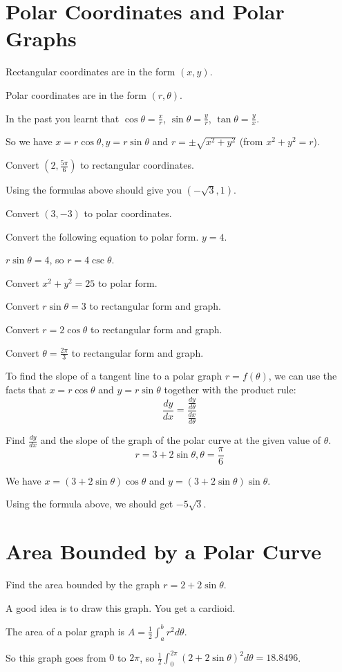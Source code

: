 \documentclass[../bccalc.tex]{subfiles}
\begin{document}
\section{Polar Coordinates and Polar Graphs}
Rectangular coordinates are in the form $(x,y)$.

Polar coordinates are in the form $(r,\theta)$.

In the past you learnt that $\cos \theta = \frac{x}{r}$, $\sin \theta = \frac{y}{r}$, $\tan\theta = \frac{y}{x}$. 

So we have $x=r\cos \theta, y=r\sin\theta$ and $r=\pm \sqrt{x^2+y^2}$ (from $x^2+y^2=r$).

\begin{example}
    Convert $\left(2,\frac{5\pi}{6}\right)$ to rectangular coordinates.

    Using the formulas above should give you $(-\sqrt{3},1)$.
\end{example}

\ex Convert $(3,-3)$ to polar coordinates.

\begin{example}
    Convert the following equation to polar form. $y=4$.

    $r\sin \theta = 4$, so $r=4\csc \theta$.
\end{example}

\ex Convert $x^2+y^2=25$ to polar form.

\ex Convert $r\sin\theta = 3$ to rectangular form and graph.

\ex Convert $r=2\cos\theta$ to rectangular form and graph.

\ex Convert $\theta=\frac{2\pi}{3}$ to rectangular form and graph.

To find the slope of a tangent line to a polar graph $r=f(\theta)$, we can use the facts that $x=r\cos\theta$ and $y=r\sin\theta$ together with the product rule:
\[ \frac{dy}{dx}=\frac{\frac{dy}{d\theta}}{\frac{dx}{d\theta}} \]

\begin{example}
    Find $\frac{dy}{dx}$ and the slope of the graph of the polar curve at the given value of $\theta$.
    \[ r=3+2\sin\theta, \theta=\frac{\pi}{6} \]

    We have $x=(3+2\sin\theta)\cos\theta$ and $y=(3+2\sin\theta)\sin\theta$.

    Using the formula above, we should get $-5\sqrt{3}$.
\end{example}

\section{Area Bounded by a Polar Curve}
\begin{example}
    Find the area bounded by the graph $r=2+2\sin\theta$.

    A good idea is to draw this graph. You get a cardioid.

    The area of a polar graph is $A=\frac{1}{2}\int_a^b r^2 d\theta$.

    So this graph goes from $0$ to $2\pi$, so $\frac{1}{2}\int_0^{2\pi}(2+2\sin\theta)^2 d\theta = 18.8496$.
\end{example}
\end{document}
